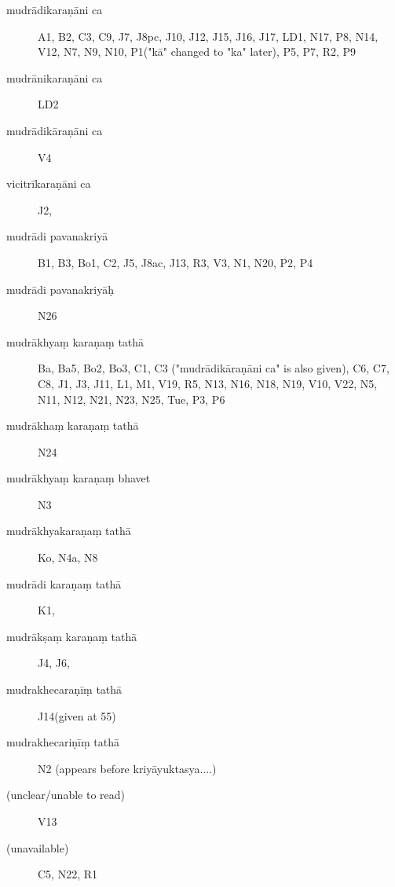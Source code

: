 \begin{ekdosis}
\begin{marma}[hp01_055]
\begin{marma}[hp01_056]
 \begin{description}
 \item[mudrādikaraṇāni ca] A1, B2, C3, C9, J7, J8pc, J10, J12, J15, J16, J17, LD1, N17, P8, N14, V12, N7, N9, N10, P1("kā" changed to "ka" later), P5, P7, R2, P9
 \item[mudrānikaraṇāni ca] LD2
\item[mudrādikāraṇāni ca]        V4
\item[vicitrīkaraṇāni ca]        J2,
\item[mudrādi pavanakriyā]        B1, B3, Bo1, C2, J5, J8ac, J13, R3, V3, N1, N20, P2, P4
\item[mudrādi pavanakriyāḥ]   N26
\item[mudrākhyaṃ karaṇaṃ tathā] Ba, Ba5, Bo2, Bo3, C1, C3 ("mudrādikāraṇāni ca" is also given), C6, C7,
 C8, J1, J3, J11, L1, M1, V19, R5, N13, N16, N18, N19, V10, V22, N5, N11, N12, N21, N23, N25, Tue, P3, P6
\item[mudrākhaṃ karaṇaṃ tathā]   N24
\item[mudrākhyaṃ karaṇaṃ bhavet]   N3
\item[mudrākhyakaraṇaṃ tathā]        Ko, N4a, N8
\item[mudrādi karaṇaṃ tathā]        K1,
\item[mudrākṣaṃ karaṇaṃ tathā]        J4, J6,
\item[mudrakhecaraṇīṃ tathā]        J14(given at 55)
\item[mudrakhecariṇīṃ tathā]        N2 (appears before kriyāyuktasya....)
\item[(unclear/unable to read)]        V13
\item[(unavailable)]         C5, N22, R1
        \end{description}
\end{marma}



\end{marma}
\end{ekdosis}
